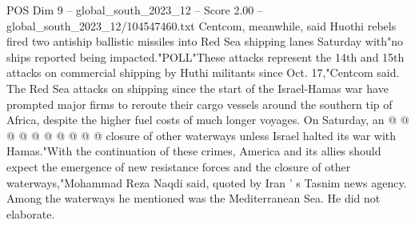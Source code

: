 \begin{textsample}{POS Dim 9 – global\_south\_2023\_12 – Score 2.00 – global\_south\_2023\_12/104547460.txt}
Centcom, meanwhile, said Huothi rebels fired two antiship ballistic missiles into Red Sea shipping lanes Saturday with"no ships reported being impacted."POLL"These attacks represent the 14th and 15th attacks on commercial shipping by Huthi militants since Oct. 17,"Centcom said.
The Red Sea attacks on shipping since the start of the Israel-Hamas war have prompted major firms to reroute their cargo vessels around the southern tip of Africa, despite the higher fuel costs of much longer voyages.
On Saturday, an @ @ @ @ @ @ @ @ @ @ closure of other waterways unless Israel halted its war with Hamas."With the continuation of these crimes, America and its allies should expect the emergence of new resistance forces and the closure of other waterways,"Mohammad Reza Naqdi said, quoted by Iran ' s Tasnim news agency.
Among the waterways he mentioned was the Mediterranean Sea.
He did not elaborate.

\end{textsample}
